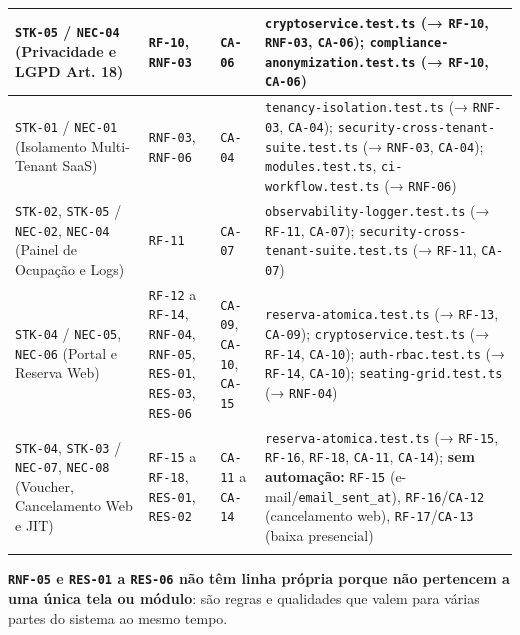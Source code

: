{{\begin{tabularx}{\textwidth}{>{\raggedright\arraybackslash}m{2.9cm} >{\raggedright\arraybackslash}m{1.8cm} >{\raggedright\arraybackslash}m{1.4cm} Y}
\midrule
\texttt{STK-05} / \texttt{NEC-04} (Privacidade e LGPD Art. 18) & \texttt{RF-10}, \texttt{RNF-03} & \texttt{CA-06} & \texttt{cryptoservice.test.ts} (→ \texttt{RF-10}, \texttt{RNF-03}, \texttt{CA-06}); \texttt{compliance-\allowbreak anonymization.test.ts} (→ \texttt{RF-10}, \texttt{CA-06}) \\
\midrule
\texttt{STK-01} / \texttt{NEC-01} (Isolamento Multi-Tenant SaaS) & \texttt{RNF-03}, \texttt{RNF-06} & \texttt{CA-04} & \texttt{tenancy-\allowbreak isolation.test.ts} (→ \texttt{RNF-03}, \texttt{CA-04}); \texttt{security-\allowbreak cross-\allowbreak tenant-\allowbreak suite.test.ts} (→ \texttt{RNF-03}, \texttt{CA-04}); \texttt{modules.test.ts}, \texttt{ci-\allowbreak workflow.test.ts} (→ \texttt{RNF-06}) \\
\midrule
\texttt{STK-02}, \texttt{STK-05} / \texttt{NEC-02}, \texttt{NEC-04} (Painel de Ocupação e Logs) & \texttt{RF-11} & \texttt{CA-07} & \texttt{observability-\allowbreak logger.test.ts} (→ \texttt{RF-11}, \texttt{CA-07}); \texttt{security-\allowbreak cross-\allowbreak tenant-\allowbreak suite.test.ts} (→ \texttt{RF-11}, \texttt{CA-07}) \\
\midrule
\texttt{STK-04} / \texttt{NEC-05}, \texttt{NEC-06} (Portal e Reserva Web) & \texttt{RF-12} a \texttt{RF-14}, \texttt{RNF-04}, \texttt{RNF-05}, \texttt{RES-01}, \texttt{RES-03}, \texttt{RES-06} & \texttt{CA-09}, \texttt{CA-10}, \texttt{CA-15} & \texttt{reserva-\allowbreak atomica.test.ts} (→ \texttt{RF-13}, \texttt{CA-09}); \texttt{cryptoservice.test.ts} (→ \texttt{RF-14}, \texttt{CA-10}); \texttt{auth-\allowbreak rbac.test.ts} (→ \texttt{RF-14}, \texttt{CA-10}); \texttt{seating-\allowbreak grid.test.ts} (→ \texttt{RNF-04}) \\
\midrule
\texttt{STK-04}, \texttt{STK-03} / \texttt{NEC-07}, \texttt{NEC-08} (Voucher, Cancelamento Web e JIT) & \texttt{RF-15} a \texttt{RF-18}, \texttt{RES-01}, \texttt{RES-02} & \texttt{CA-11} a \texttt{CA-14} & \texttt{reserva-\allowbreak atomica.test.ts} (→ \texttt{RF-15}, \texttt{RF-16}, \texttt{RF-18}, \texttt{CA-11}, \texttt{CA-14}); \textbf{sem automação:} \texttt{RF-15} (e-mail/\texttt{email\_sent\_at}), \texttt{RF-16}/\texttt{CA-12} (cancelamento web), \texttt{RF-17}/\texttt{CA-13} (baixa presencial) \\
\bottomrule
\end{tabularx}%
}
}

\textbf{\texttt{RNF-05} e \texttt{RES-01} a \texttt{RES-06} não têm linha própria porque não pertencem a uma única tela ou módulo}: são regras e qualidades que valem para várias partes do sistema ao mesmo tempo.

